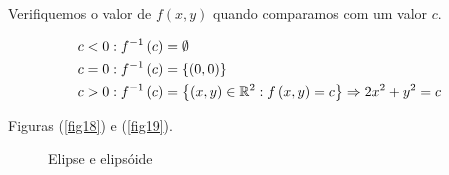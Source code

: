 \documentclass{book}
\begin{document}
\begin{sol}
    Verifiquemos o valor de $f\left( {x,y} \right)$ quando comparamos com um valor $c$.

\[
\begin{gathered}
c < 0:f^{ - 1} \left( c \right) = \emptyset  \hfill \\
  c = 0:f^{ - 1} \left( c \right) = \left\{ {\left( {0,0} \right)} \right\} \hfill \\
  c > 0:f^{ - 1} \left( c \right) = \left\{ {\left( {x,y} \right) \in \R^2 :f\left( {x,y} \right) = c} \right\} \Rightarrow 2x^2  + y^2  = c \hfill \\
\end{gathered}
\]

Figuras (\ref{fig18}) e (\ref{fig19}).

\begin{figure}[!h]
  \centering
  \quad
  \caption{Elipse e elips\'oide}
\end{figure}

\end{sol}
\end{document}
